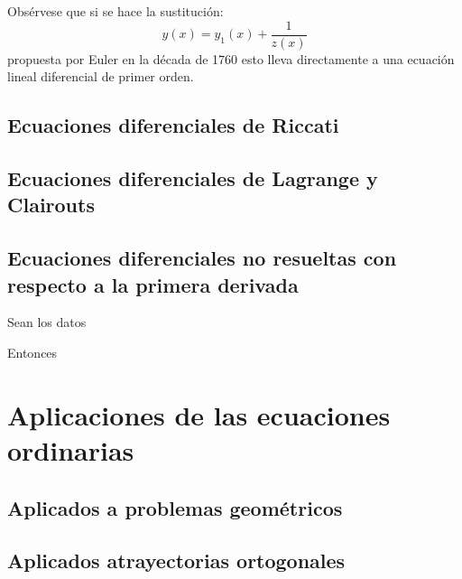 \documentclass[10pt,]{krantz}
\theoremstyle{definition}
\theoremstyle{definition}
\theoremstyle{definition}
\theoremstyle{remark}
\let\BeginKnitrBlock\begin \let\EndKnitrBlock\end
\begin{document}
\BeginKnitrBlock{remark}
{}Obsérvese que si se hace la sustitución:
\[y(x)=y_{1}(x)+{\frac {1}{z(x)}}\]
propuesta por Euler en la década de 1760 esto lleva directamente a una ecuación lineal diferencial de primer orden.
\EndKnitrBlock{remark}

\hypertarget{ecuaciones-diferenciales-de-riccati}{%
\section{Ecuaciones diferenciales de Riccati}\label{ecuaciones-diferenciales-de-riccati}}

\hypertarget{ecuaciones-diferenciales-de-lagrange-y-clairouts}{%
\section{Ecuaciones diferenciales de Lagrange y Clairouts}\label{ecuaciones-diferenciales-de-lagrange-y-clairouts}}

\hypertarget{ecuaciones-diferenciales-no-resueltas-con-respecto-a-la-primera-derivada}{%
\section{Ecuaciones diferenciales no resueltas con respecto a la primera derivada}\label{ecuaciones-diferenciales-no-resueltas-con-respecto-a-la-primera-derivada}}

\BeginKnitrBlock{exercise}
\protect\hypertarget{exr:unnamed-chunk-7}{}{\label{exr:unnamed-chunk-7} }Sean los datos
\EndKnitrBlock{exercise}

\BeginKnitrBlock{solution}
{}Entonces
\EndKnitrBlock{solution}

\hypertarget{aplicaciones-de-las-ecuaciones-ordinarias}{%
\chapter{Aplicaciones de las ecuaciones ordinarias}\label{aplicaciones-de-las-ecuaciones-ordinarias}}

\hypertarget{aplicados-a-problemas-geomuxe9tricos}{%
\section{Aplicados a problemas geométricos}\label{aplicados-a-problemas-geomuxe9tricos}}

\hypertarget{aplicados-atrayectorias-ortogonales}{%
\section{Aplicados atrayectorias ortogonales}\label{aplicados-atrayectorias-ortogonales}}
\end{document}

